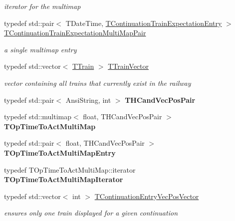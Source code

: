\begin{DoxyCompactItemize}
\begin{DoxyCompactList}\small\item\em iterator for the multimap \end{DoxyCompactList}\item 
\mbox{\label{class_t_train_controller_a5adc75543948ea32915ef025ace798b2}} 
typedef std\+::pair$<$ T\+Date\+Time, \mbox{\hyperlink{class_t_train_controller_1_1_t_continuation_train_expectation_entry}{T\+Continuation\+Train\+Expectation\+Entry}} $>$ \mbox{\hyperlink{class_t_train_controller_a5adc75543948ea32915ef025ace798b2}{T\+Continuation\+Train\+Expectation\+Multi\+Map\+Pair}}
\begin{DoxyCompactList}\small\item\em a single multimap entry \end{DoxyCompactList}\item 
typedef std\+::vector$<$ \mbox{\hyperlink{class_t_train}{T\+Train}} $>$ \mbox{\hyperlink{class_t_train_controller_aa9073b97736a2733dbdaf8dc52e34c24}{T\+Train\+Vector}}
\begin{DoxyCompactList}\small\item\em vector containing all trains that currently exist in the railway \end{DoxyCompactList}\item 
\mbox{\label{class_t_train_controller_a1eb3c8cb9ff238f5000c7567ab1cd7e1}} 
typedef std\+::pair$<$ Ansi\+String, int $>$ {\bfseries T\+H\+Cand\+Vec\+Pos\+Pair}
\item 
\mbox{\label{class_t_train_controller_ad048a6a119316f72047e40188f43afca}} 
typedef std\+::multimap$<$ float, T\+H\+Cand\+Vec\+Pos\+Pair $>$ {\bfseries T\+Op\+Time\+To\+Act\+Multi\+Map}
\item 
\mbox{\label{class_t_train_controller_ae5821b48e2fe5c77f169c9f07019f20e}} 
typedef std\+::pair$<$ float, T\+H\+Cand\+Vec\+Pos\+Pair $>$ {\bfseries T\+Op\+Time\+To\+Act\+Multi\+Map\+Entry}
\item 
\mbox{\label{class_t_train_controller_ada41a0ac7bb3a3d27c9095dde80d9b59}} 
typedef T\+Op\+Time\+To\+Act\+Multi\+Map\+::iterator {\bfseries T\+Op\+Time\+To\+Act\+Multi\+Map\+Iterator}
\item 
\mbox{\label{class_t_train_controller_a1af939f4f452d7f2002df3dac7efb743}} 
typedef std\+::vector$<$ int $>$ \mbox{\hyperlink{class_t_train_controller_a1af939f4f452d7f2002df3dac7efb743}{T\+Continuation\+Entry\+Vec\+Pos\+Vector}}
\begin{DoxyCompactList}\small\item\em ensures only one train displayed for a given continuation \end{DoxyCompactList}\end{DoxyCompactItemize}
